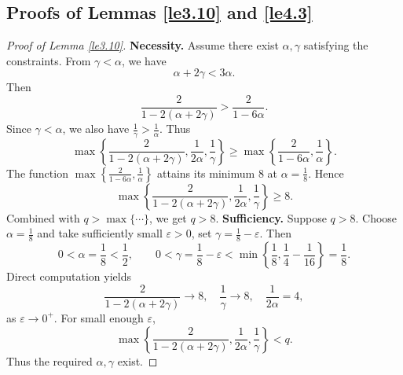 \documentclass[10pt]{article}
\numberwithin{figure}{section}
\numberwithin{equation}{section}
\newcommand{\0}{{\theta}}
\begin{document}
 \subsection{Proofs of Lemmas \ref{le3.10} and \ref{le4.3}}\label{A.4}
\begin{proof}[Proof of Lemma \ref{le3.10}] \textbf{Necessity.}
Assume there exist $\alpha,\gamma$ satisfying the constraints.
From $\gamma<\alpha$, we have
$$
\alpha+2\gamma < 3\alpha.
$$
Then
$$
\frac{2}{1-2(\alpha+2\gamma)}>\frac{2}{1-6\alpha}.
$$
Since $\gamma<\alpha$, we also have $\frac1\gamma>\frac1\alpha$.
Thus
$$
\max\left\{\frac{2}{1-2(\alpha+2\gamma)},\frac{1}{2\alpha},\frac1\gamma\right\}
\ge \max\left\{\frac{2}{1-6\alpha},\frac1\alpha\right\}.
$$
The function $\max\left\{\frac{2}{1-6\alpha},\frac1\alpha\right\}$ attains its minimum $8$ at $\alpha=\frac18$.
Hence
$$
\max\left\{\frac{2}{1-2(\alpha+2\gamma)},\frac{1}{2\alpha},\frac1\gamma\right\}\ge 8.
$$
Combined with $q>\max\{\cdots\}$, we get $q>8$.
\vs
\noindent\textbf{Sufficiency.}
Suppose $q>8$. Choose $\alpha=\frac18$ and take sufficiently small $\varepsilon>0$, set $\gamma=\frac18-\varepsilon$.
Then
$$
0<\alpha=\frac18<\frac12,\qquad
0<\gamma=\frac18-\varepsilon<\min\left\{\frac18,\frac14-\frac{1}{16}\right\}=\frac18.
$$
Direct computation yields
$$
\frac{2}{1-2(\alpha+2\gamma)}\to 8,\quad \frac1\gamma\to8,\quad \frac{1}{2\alpha}=4,
$$
as $\varepsilon\to0^+$.
For small enough $\varepsilon$,
$$
\max\left\{\frac{2}{1-2(\alpha+2\gamma)},\frac{1}{2\alpha},\frac1\gamma\right\}<q.
$$
Thus the required $\alpha,\gamma$ exist.
\end{proof}
\end{document}
